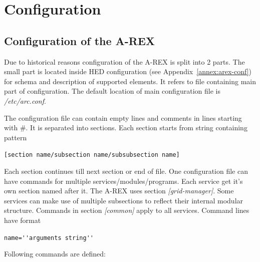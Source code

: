 \documentclass{article}                            %
\begin{document}
\section{Configuration}

\subsection{Configuration of the A-REX\label{SubSection:ConfigFile}}

Due to historical reasons configuration of the A-REX is split into
2 parts. The small part is located inside HED configuration (see Appendix~\ref{annex:arex-conf}) for schema and description of supported elements. It refers to
file containing main part of configuration. The default location of
main configuration file is \textit{/etc/arc.conf}.

The configuration file can contain empty lines and comments in lines
starting with \#. It is separated into sections. Each section starts
from string containing pattern

\begin{shaded}
\verb|[section name/subsection name/subsubsection name]|
\end{shaded}

Each section continues till next section or end of file. One configuration
file can have commands for multiple services/modules/programs. Each
service get it's own section named after it. The A-REX uses section
\emph{{[}grid-manager]}. Some services can make use of multiple subsections
to reflect their internal modular structure. Commands in section \emph{{[}common]}
apply to all services. Command lines have format 

\begin{shaded}
\verb|name=''arguments string''|
\end{shaded}
Following commands are defined:
\end{document}

